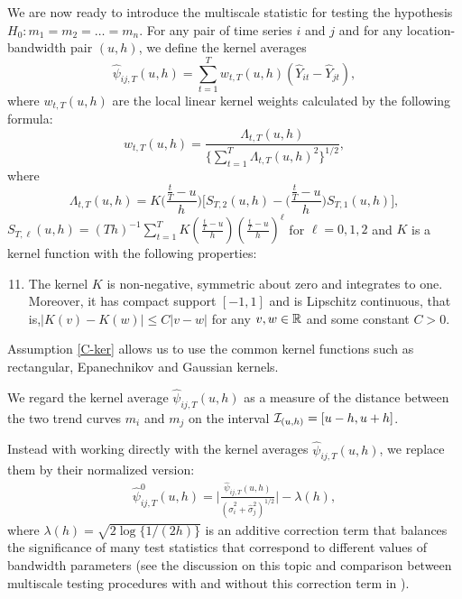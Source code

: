 \documentclass[a4paper,12pt]{article}
\begin{document}
We are now ready to introduce the multiscale statistic for testing the hypothesis $H_0: m_1 = m_2 = \ldots = m_n$. For any pair of time series $i$ and $j$ and for any location-bandwidth pair $(u, h)$, we define the kernel averages
\[ \widehat{\psi}_{ij,T}(u,h) = \sum\limits_{t=1}^T w_{t,T}(u,h)(\widehat{Y}_{it} - \widehat{Y}_{jt}), \]
where $w_{t,T}(u,h)$ are the local linear kernel weights calculated by the following formula:
\begin{equation}\label{eq:weights}
w_{t,T}(u,h) = \frac{\Lambda_{t,T}(u,h)}{ \{\sum\nolimits_{t=1}^T \Lambda_{t,T}(u,h)^2 \}^{1/2} }, 
\end{equation}
where
\[ \Lambda_{t,T}(u,h) = K\Big(\frac{\frac{t}{T}-u}{h}\Big) \Big[ S_{T,2}(u,h) - \Big(\frac{\frac{t}{T}-u}{h}\Big) S_{T,1}(u,h) \Big], \]
$S_{T,\ell}(u,h) = (Th)^{-1} \sum\nolimits_{t=1}^T K(\frac{\frac{t}{T}-u}{h}) (\frac{\frac{t}{T}-u}{h})^\ell$ for $\ell = 0,1,2$ and $K$ is a kernel function with the following properties: 
\begin{enumerate}[label=(C\arabic*),leftmargin=1.05cm]
\setcounter{enumi}{10}
\item \label{C-ker} The kernel $K$ is non-negative, symmetric about zero and integrates to one. Moreover, it has compact support $[-1,1]$ and is Lipschitz continuous, that is,\linebreak $|K(v) - K(w)| \le C |v-w|$ for any $v,w \in \mathbb{R}$ and some constant $C > 0$. 
\end{enumerate} 
Assumption \ref{C-ker} allows us to use the common kernel functions such as rectangular, Epanechnikov and Gaussian kernels.

We regard the kernel average $\widehat{\psi}_{ij,T}(u,h)$ as a measure of the distance between the two trend curves $m_i$ and $m_j$ on the interval $\mathcal{I}_{(u, h)} = [u-h,u+h]$.

Instead with working directly with the kernel averages $\widehat{\psi}_{ij,T}(u,h)$, we replace them by their normalized version:
\begin{align}\label{eq:test:psi_zero_ij}
\hat{\psi}^0_{ij,T}(u, h) =  \Big|\frac{\widehat{\psi}_{ij,T}(u,h)}{(\widehat{\sigma}_i^2 + \widehat{\sigma}_j^2)^{1/2}}\Big| - \lambda(h),
\end{align}
where $\lambda(h) = \sqrt{2 \log \{ 1/(2h) \}}$ is an additive correction term that balances the significance of many test statistics that correspond to different values of bandwidth parameters (see the discussion on this topic and comparison between multiscale testing procedures with and without this correction term in \citet{KhismatullinaVogt2020}).
\end{document}
